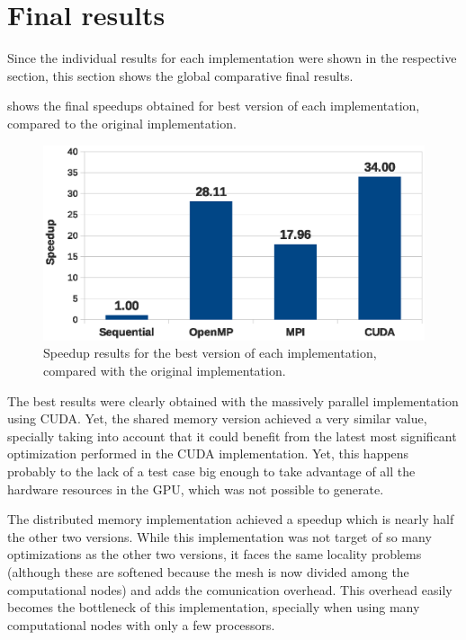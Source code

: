 \section{Final results}
\label{sec:finalresults}

Since the individual results for each implementation were shown in the respective section, this section shows the global comparative final results.

 shows the final speedups obtained for best version of each implementation, compared to the original implementation.

\begin{figure}[!htp]
	\centering
	\includegraphics[width=\columnwidth]{images/graph_comparison_all.eps}
	\caption{Speedup results for the best version of each implementation, compared with the original implementation.}
	\label{fig:results:final}
\end{figure}

The best results were clearly obtained with the massively parallel implementation using CUDA. Yet, the shared memory version achieved a very similar value, specially taking into account that it could benefit from the latest most significant optimization performed in the CUDA implementation.
Yet, this happens probably to the lack of a test case big enough to take advantage of all the hardware resources in the GPU, which was not possible to generate.

The distributed memory implementation achieved a speedup which is nearly half the other two versions.
While this implementation was not target of so many optimizations as the other two versions, it faces the same locality problems (although these are softened because the mesh is now divided among the computational nodes) and adds the comunication overhead.
This overhead easily becomes the bottleneck of this implementation, specially when using many computational nodes with only a few processors.
